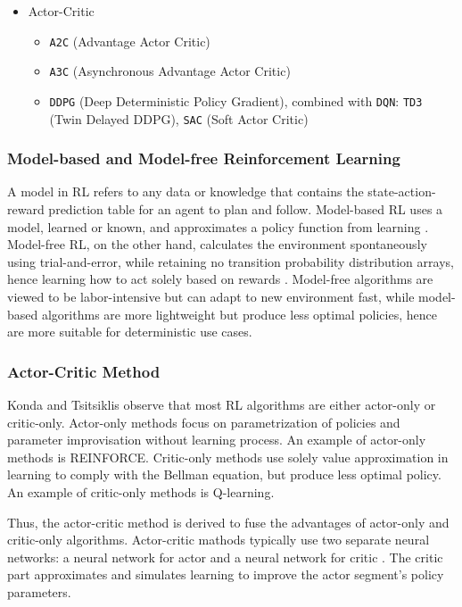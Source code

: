 \begin{enumerate}
\begin{enumerate}
\begin{enumerate}
\begin{itemize}
				\item Actor-Critic
				\begin{itemize}
					\item \texttt{A2C} (Advantage Actor Critic)
					\item \texttt{A3C} (Asynchronous Advantage Actor Critic)
					\item \texttt{DDPG} (Deep Deterministic Policy Gradient), combined with \texttt{DQN}: \texttt{TD3} (Twin Delayed DDPG), \texttt{SAC} (Soft Actor Critic)
				\end{itemize}
			\end{itemize}						
		\end{enumerate}
	\end{enumerate}
\end{enumerate}

\subsubsection{Model-based and Model-free Reinforcement Learning}

A model in RL refers to any data or knowledge that contains the state-action-reward prediction table for an agent to plan and follow. Model-based RL uses a model, learned or known, and approximates a policy function from learning \cite{RL04}. Model-free RL, on the other hand, calculates the environment spontaneously using trial-and-error, while retaining no transition probability distribution arrays, hence learning how to act solely based on rewards \cite{RL05}. Model-free algorithms are viewed to be labor-intensive but can adapt to new environment fast, while model-based algorithms are more lightweight but produce less optimal policies, hence are more suitable for deterministic use cases.

\subsubsection{Actor-Critic Method}
Konda and Tsitsiklis \cite{RL06} observe that most RL algorithms are either actor-only or critic-only. Actor-only methods focus on parametrization of policies and parameter improvisation without learning process. An example of actor-only methods is REINFORCE. Critic-only methods use solely value approximation in learning to comply with the Bellman equation, but produce less optimal policy. An example of critic-only methods is Q-learning.

Thus, the actor-critic method is derived to fuse the advantages of actor-only and critic-only algorithms. Actor-critic mathods typically use two separate neural networks: a neural network for actor and a neural network for critic \cite{RL101}. The critic part approximates and simulates learning to improve the actor segment's policy parameters.

